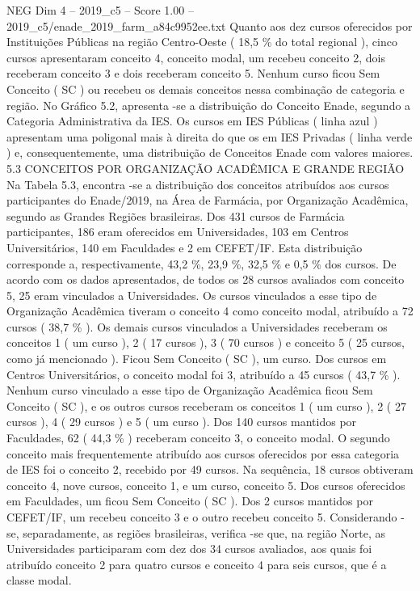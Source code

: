 \begin{textsample}{NEG Dim 4 – 2019\_c5 – Score 1.00 – 2019\_c5/enade\_2019\_farm\_a84c9952ee.txt}
Quanto aos dez cursos oferecidos por Instituições Públicas na região Centro-Oeste ( 18,5 \% do total regional ), cinco cursos apresentaram conceito 4, conceito modal, um recebeu conceito 2, dois receberam conceito 3 e dois receberam conceito 5.
Nenhum curso ficou Sem Conceito ( SC ) ou recebeu os demais conceitos nessa combinação de categoria e região.
No Gráfico 5.2, apresenta -se a distribuição do Conceito Enade, segundo a Categoria Administrativa da IES.
Os cursos em IES Públicas ( linha azul ) apresentam uma poligonal mais à direita do que os em IES Privadas ( linha verde ) e, consequentemente, uma distribuição de Conceitos Enade com valores maiores. 5.3 CONCEITOS POR ORGANIZAÇÃO ACADÊMICA E GRANDE REGIÃO Na Tabela 5.3, encontra -se a distribuição dos conceitos atribuídos aos cursos participantes do Enade/2019, na Área de Farmácia, por Organização Acadêmica, segundo as Grandes Regiões brasileiras.
Dos 431 cursos de Farmácia participantes, 186 eram oferecidos em Universidades, 103 em Centros Universitários, 140 em Faculdades e 2 em CEFET/IF.
Esta distribuição corresponde a, respectivamente, 43,2 \%, 23,9 \%, 32,5 \% e 0,5 \% dos cursos.
De acordo com os dados apresentados, de todos os 28 cursos avaliados com conceito 5, 25 eram vinculados a Universidades.
Os cursos vinculados a esse tipo de Organização Acadêmica tiveram o conceito 4 como conceito modal, atribuído a 72 cursos ( 38,7 \% ).
Os demais cursos vinculados a Universidades receberam os conceitos 1 ( um curso ), 2 ( 17 cursos ), 3 ( 70 cursos ) e conceito 5 ( 25 cursos, como já mencionado ).
Ficou Sem Conceito ( SC ), um curso.
Dos cursos em Centros Universitários, o conceito modal foi 3, atribuído a 45 cursos ( 43,7 \% ).
Nenhum curso vinculado a esse tipo de Organização Acadêmica ficou Sem Conceito ( SC ), e os outros cursos receberam os conceitos 1 ( um curso ), 2 ( 27 cursos ), 4 ( 29 cursos ) e 5 ( um curso ).
Dos 140 cursos mantidos por Faculdades, 62 ( 44,3 \% ) receberam conceito 3, o conceito modal.
O segundo conceito mais frequentemente atribuído aos cursos oferecidos por essa categoria de IES foi o conceito 2, recebido por 49 cursos.
Na sequência, 18 cursos obtiveram conceito 4, nove cursos, conceito 1, e um curso, conceito 5.
Dos cursos oferecidos em Faculdades, um ficou Sem Conceito ( SC ).
Dos 2 cursos mantidos por CEFET/IF, um recebeu conceito 3 e o outro recebeu conceito 5.
Considerando -se, separadamente, as regiões brasileiras, verifica -se que, na região Norte, as Universidades participaram com dez dos 34 cursos avaliados, aos quais foi atribuído conceito 2 para quatro cursos e conceito 4 para seis cursos, que é a classe modal.

\end{textsample}
